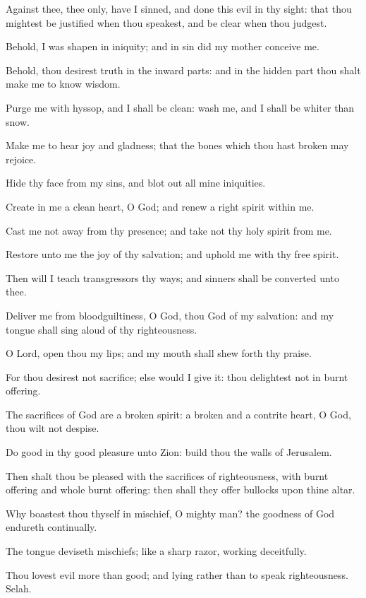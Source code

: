 \Verse Against thee, thee only, have I sinned, and done this evil in thy sight: that thou mightest be justified when thou speakest, and be clear when thou judgest.

\Verse Behold, I was shapen in iniquity; and in sin did my mother conceive me.

\Verse Behold, thou desirest truth in the inward parts: and in the hidden part thou shalt make me to know wisdom.

\Verse Purge me with hyssop, and I shall be clean: wash me, and I shall be whiter than snow.

\Verse Make me to hear joy and gladness; that the bones which thou hast broken may rejoice.

\Verse Hide thy face from my sins, and blot out all mine iniquities.

\Verse Create in me a clean heart, O God; and renew a right spirit within me.

\Verse Cast me not away from thy presence; and take not thy holy spirit from me.

\Verse Restore unto me the joy of thy salvation; and uphold me with thy free spirit.

\Verse Then will I teach transgressors thy ways; and sinners shall be converted unto thee.

\Verse Deliver me from bloodguiltiness, O God, thou God of my salvation: and my tongue shall sing aloud of thy righteousness.

\Verse O Lord, open thou my lips; and my mouth shall shew forth thy praise.

\Verse For thou desirest not sacrifice; else would I give it: thou delightest not in burnt offering.

\Verse The sacrifices of God are a broken spirit: a broken and a contrite heart, O God, thou wilt not despise.

\Verse Do good in thy good pleasure unto Zion: build thou the walls of Jerusalem.

\Verse Then shalt thou be pleased with the sacrifices of righteousness, with burnt offering and whole burnt offering: then shall they offer bullocks upon thine altar.




\Chapter
\Verse Why boastest thou thyself in mischief, O mighty man? the goodness of God endureth continually.

\Verse The tongue deviseth mischiefs; like a sharp razor, working deceitfully.

\Verse Thou lovest evil more than good; and lying rather than to speak righteousness. Selah.

